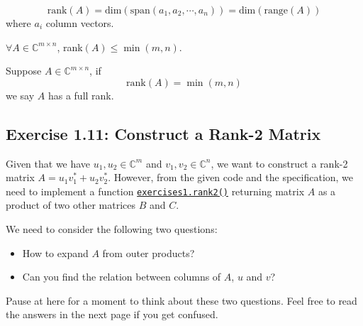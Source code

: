 \begin{definition}
  \[
  \text{rank}(A) = \text{dim}(\text{span}(a_1, a_2, \cdots, a_n)) = \text{dim}(\text{range}(A))
\]
where \(a_i\)  column vectors. 
\end{definition}
\begin{property}
  \(\forall A \in \mathbb{C}^{m \times n}\), rank\((A) \leq \min(m, n)\).
\end{property}
\begin{definition}
  Suppose \(A \in \mathbb{C}^{m \times n}\), if 
  \[
    \text{rank}(A) = \min(m, n)
  \]
  we say \(A\) has a full rank. \checked
\end{definition}

\subsection*{Exercise 1.11: Construct a Rank-2 Matrix}%
\begin{problem}
  Given that we have $u_1, u_2 \in \mathbb{C}^{m}$ and $v_1, v_2 \in \mathbb{C}^{n}$, we want to construct a rank-2 matrix $A = u_1v_1^{*} + u_2v_2^{*}$. However, from the given code and the specification, we need to implement a function \href{https://comp-lin-alg.github.io/cla_utils.html#cla_utils.exercises1.rank2}{\texttt{exercises1.rank2()}} returning matrix  $A$ as a product of two other matrices $B$ and $C$.
\end{problem}
\begin{hint}
  We need to consider the following two questions:
\end{hint}
\begin{itemize}
  \item How to expand $A$ from outer products?
  \item Can you find the relation between columns of \(A\), \(u\) and \(v\)?
\end{itemize}
Pause at here for a moment to think about these two questions. Feel free to read the answers in the next page if you get confused.
\newpage

